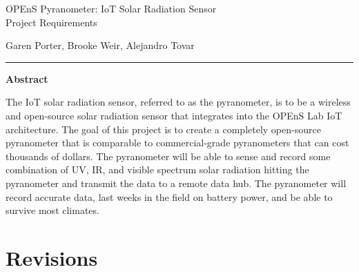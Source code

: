 \documentclass[10pt,draftclsnofoot,onecolumn,letterpaper]{article}
\begin{document}
\begin{Center}
{\fontsize{14pt}{16.8pt}\selectfont OPEnS Pyranometer: IoT Solar Radiation Sensor\\ Project Requirements\par}
\end{Center}\par
    
\begin{Center}
Garen Porter, Brooke Weir, Alejandro Tovar\\
\end{Center}\par
\hrule
\begin{Center}
{\fontsize{12pt}{16.8pt}\selectfont \textbf{Abstract}\par}
\end{Center}\par
    
{\fontsize{10pt}{12.0pt}\selectfont The IoT solar radiation sensor, referred to as the pyranometer, is to be a wireless and open-source solar radiation sensor that integrates into the OPEnS Lab IoT architecture. The goal of this project is to create a completely open-source pyranometer that is comparable to commercial-grade pyranometers that can cost thousands of dollars. The pyranometer will be able to sense and record some combination of UV, IR, and visible spectrum solar radiation hitting the pyranometer and transmit the data to a remote data hub. The pyranometer will record accurate data, last weeks in the field on battery power, and be able to survive most climates.
\par}\par
    
\newpage

\tableofcontents

\newpage


\section{Revisions}
\end{document}
